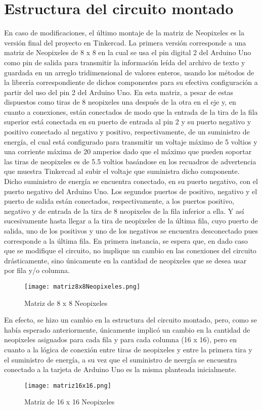 \documentclass{article}
\begin{document}
\section{Estructura del circuito montado}
En caso de modificaciones, el último montaje de la matriz de Neopixeles es la versión final del proyecto en Tinkercad. La primera versión corresponde a una matriz de Neopixeles de 8 x 8 en la cual se usa el pin digital 2 del Arduino Uno como pin de salida para transmitir la información leída del archivo de texto y guardada en un arreglo tridimensional de valores enteros, usando los métodos de la librería correspondiente de dichos componentes para su efectiva configuración a partir del uso del pin 2 del Arduino Uno. En esta matriz, a pesar de estas dispuestos como tiras de 8 neopixeles una después de la otra en el eje y, en cuanto a conexiones, están conectados de modo que la entrada de la tira de la fila superior está conectada en su puerto de entrada al pin 2 y su puerto negativo y positivo conectado al negativo y positivo, respectivamente, de un suministro de energía, el cual está configurado para transmitir un voltaje máximo de 5 voltios y una corriente máxima de 20 amperios dado que el máximo que pueden soportar las tiras de neopixeles es de 5.5 voltios basándose en los recuadros de advertencia que muestra Tinkercad al subir el voltaje que suministra dicho componente. Dicho suministro de energía se encuentra conectado, en su puerto negativo, con el puerto negativo del Arduino Uno. Los segundos puertos de positivo, negativo y el puerto de salida están conectados, respectivamente, a los puertos positivo, negativo y de entrada de la tira de 8 neopixeles de la fila inferior a ella. Y así sucesivamente hasta llegar a la tira de neopixeles de la última fila, cuyo puerto de salida, uno de los positivos y uno de los negativos se encuentra desconectado pues corresponde a la última fila. En primera instancia, se espera que, en dado caso que se modifique el circuito, no implique un cambio en las conexiones del circuito drásticamente, sino únicamente en la cantidad de neopixeles que se desea usar por fila y/o columna.
\begin{figure} 
    \centering
    \texttt{[image: matriz8x8Neopixeles.png]}
    \caption{Matriz de 8 x 8 Neopixeles}
    \label{fig:mat8x8_neo}
\end{figure}
En efecto, se hizo un cambio en la estructura del circuito montado, pero, como se había esperado anteriormente, únicamente implicó un cambio en la cantidad de neopixeles asignados para cada fila y para cada columna (16 x 16), pero en cuanto a la lógica de conexión entre tiras de neopixeles y entre la primera tira y el suministro de energía, a su vez que el suministro de neergía se encuentra conectado a la tarjeta de Arduino Uno es la misma planteada inicialmente.
\begin{figure} 
    \centering
    \texttt{[image: matriz16x16.png]}
    \caption{Matriz de 16 x 16 Neopixeles}
    \label{fig:mat16x16_neo}
\end{figure}
\end{document}

